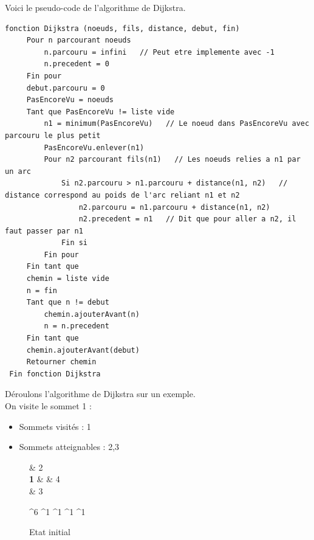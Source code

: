 \documentclass[a4paper,12pt,final] {article}
\begin{document}
Voici le pseudo-code de l'algorithme de Dijkstra.
\begin{lstlisting}
fonction Dijkstra (noeuds, fils, distance, debut, fin)
     Pour n parcourant noeuds
         n.parcouru = infini   // Peut etre implemente avec -1
         n.precedent = 0
     Fin pour
     debut.parcouru = 0
     PasEncoreVu = noeuds
     Tant que PasEncoreVu != liste vide
         n1 = minimum(PasEncoreVu)   // Le noeud dans PasEncoreVu avec parcouru le plus petit
         PasEncoreVu.enlever(n1)
         Pour n2 parcourant fils(n1)   // Les noeuds relies a n1 par un arc
             Si n2.parcouru > n1.parcouru + distance(n1, n2)   // distance correspond au poids de l'arc reliant n1 et n2
                 n2.parcouru = n1.parcouru + distance(n1, n2)
                 n2.precedent = n1   // Dit que pour aller a n2, il faut passer par n1
             Fin si
         Fin pour
     Fin tant que
     chemin = liste vide
     n = fin
     Tant que n != debut
         chemin.ajouterAvant(n)
         n = n.precedent
     Fin tant que
     chemin.ajouterAvant(debut)
     Retourner chemin
 Fin fonction Dijkstra
\end{lstlisting}

Déroulons l'algorithme de Dijkstra sur un exemple.\\
On visite le sommet 1 :
\begin{itemize}
\item Sommets visités : 1
\item Sommets atteignables : 2,3
\end{itemize}

\begin{figure}[htpd]
 \centering
 \begin{psmatrix}[mnode=circle]
	    & 2\\
	 {\color{red} \bf 1} &    & 4\\
	    & 3\\
\end{psmatrix}
	
	^{6}
	^{1}
	^{1}
	^{1}
	^{1}

  \caption{Etat initial}
\end{figure}
\end{document}
